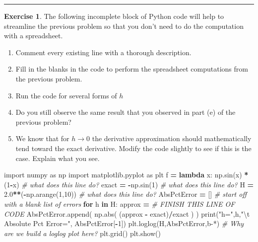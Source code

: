 \documentclass[
]{book}
\newenvironment{Shaded}{\begin{snugshade}}{\end{snugshade}}
\newcommand{\BuiltInTok}[1]{#1}
\newcommand{\CharTok}[1]{\textcolor[rgb]{0.31,0.60,0.02}{#1}}
\newcommand{\CommentTok}[1]{\textcolor[rgb]{0.56,0.35,0.01}{\textit{#1}}}
\newcommand{\ControlFlowTok}[1]{\textcolor[rgb]{0.13,0.29,0.53}{\textbf{#1}}}
\newcommand{\DecValTok}[1]{\textcolor[rgb]{0.00,0.00,0.81}{#1}}
\newcommand{\FloatTok}[1]{\textcolor[rgb]{0.00,0.00,0.81}{#1}}
\newcommand{\ImportTok}[1]{#1}
\newcommand{\KeywordTok}[1]{\textcolor[rgb]{0.13,0.29,0.53}{\textbf{#1}}}
\newcommand{\NormalTok}[1]{#1}
\newcommand{\OperatorTok}[1]{\textcolor[rgb]{0.81,0.36,0.00}{\textbf{#1}}}
\newcommand{\StringTok}[1]{\textcolor[rgb]{0.31,0.60,0.02}{#1}}
\providecommand{\tightlist}{%
  \setlength{\itemsep}{0pt}\setlength{\parskip}{0pt}}
\theoremstyle{definition}
\theoremstyle{definition}
\theoremstyle{definition}
\newtheorem{exercise}{Exercise}[chapter]
\theoremstyle{remark}
\begin{document}
\begin{center}\rule{0.5\linewidth}{0.5pt}\end{center}

\begin{exercise}
\protect\hypertarget{exr:unnamed-chunk-147}{}{\label{exr:unnamed-chunk-147} }The following incomplete block of Python code will help to streamline the previous problem so that you don't need to do the computation with a spreadsheet.

\begin{enumerate}
\def\labelenumi{\alph{enumi}.}
\tightlist
\item
  Comment every existing line with a thorough description.
\item
  Fill in the blanks in the code to perform the spreadsheet computations from the previous problem.
\item
  Run the code for several forms of \(h\)
\item
  Do you still observe the same result that you observed in part (e) of the previous problem?
\item
  We know that for \(h \to 0\) the derivative approximation should mathematically tend toward the exact derivative. Modify the code slightly to see if this is the case. Explain what you see.
\end{enumerate}
\end{exercise}

\begin{Shaded}
\begin{Highlighting}[]
\ImportTok{import}\NormalTok{ numpy }\ImportTok{as}\NormalTok{ np}
\ImportTok{import}\NormalTok{ matplotlib.pyplot }\ImportTok{as}\NormalTok{ plt}
\NormalTok{f }\OperatorTok{=} \KeywordTok{lambda}\NormalTok{ x: np.sin(x) }\OperatorTok{*}\NormalTok{ (}\DecValTok{1}\OperatorTok{{-}}\NormalTok{x) }\CommentTok{\# what does this line do?}
\NormalTok{exact }\OperatorTok{=} \OperatorTok{{-}}\NormalTok{np.sin(}\DecValTok{1}\NormalTok{) }\CommentTok{\# what does this line do?}
\NormalTok{H }\OperatorTok{=} \FloatTok{2.0}\OperatorTok{**}\NormalTok{(}\OperatorTok{{-}}\NormalTok{np.arange(}\DecValTok{1}\NormalTok{,}\DecValTok{10}\NormalTok{)) }\CommentTok{\# what does this line do?}
\NormalTok{AbsPctError }\OperatorTok{=}\NormalTok{ [] }\CommentTok{\# start off with a blank list of errors}
\ControlFlowTok{for}\NormalTok{ h }\KeywordTok{in}\NormalTok{ H:}
\NormalTok{    approx }\OperatorTok{=} \CommentTok{\# FINISH THIS LINE OF CODE}
\NormalTok{    AbsPctError.append( np.}\BuiltInTok{abs}\NormalTok{( (approx }\OperatorTok{{-}}\NormalTok{ exact)}\OperatorTok{/}\NormalTok{exact ) )}
    \BuiltInTok{print}\NormalTok{(}\StringTok{"h="}\NormalTok{,h,}\StringTok{"}\CharTok{\textbackslash{}t}\StringTok{ Absolute Pct Error="}\NormalTok{, AbsPctError[}\OperatorTok{{-}}\DecValTok{1}\NormalTok{])}
\NormalTok{plt.loglog(H,AbsPctError,}\StringTok{\textquotesingle{}b{-}*\textquotesingle{}}\NormalTok{) }\CommentTok{\# Why are we build a loglog plot here?}
\NormalTok{plt.grid()}
\NormalTok{plt.show()}
\end{Highlighting}
\end{Shaded}
\end{document}
